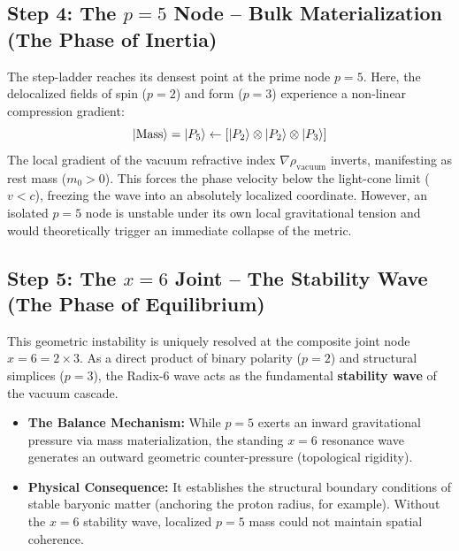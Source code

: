 \documentclass[11pt,a4paper]{article}
\theoremstyle{plain}
\theoremstyle{definition}
\theoremstyle{remark}
\begin{document}
\subsection{Step 4: The $p=5$ Node – Bulk Materialization (The Phase of Inertia)}
The step-ladder reaches its densest point at the prime node $p=5$. Here, the delocalized fields of spin ($p=2$) and form ($p=3$) experience a non-linear compression gradient:
\begin{equation}
\ket{\text{Mass}} = \ket{P_5} \leftarrow \left[ \ket{P_2} \otimes \ket{P_2} \otimes \ket{P_3} \right]
\end{equation}
The local gradient of the vacuum refractive index $\nabla\rho_{\text{vacuum}}$ inverts, manifesting as rest mass ($m_0 > 0$). This forces the phase velocity below the light-cone limit ($v < c$), freezing the wave into an absolutely localized coordinate. However, an isolated $p=5$ node is unstable under its own local gravitational tension and would theoretically trigger an immediate collapse of the metric.

\subsection{Step 5: The $x=6$ Joint – The Stability Wave (The Phase of Equilibrium)}
This geometric instability is uniquely resolved at the composite joint node $x = 6 = 2 \times 3$. As a direct product of binary polarity ($p=2$) and structural simplices ($p=3$), the Radix-6 wave acts as the fundamental \textbf{stability wave} of the vacuum cascade.
\begin{itemize}
    \item \textbf{The Balance Mechanism:} While $p=5$ exerts an inward gravitational pressure via mass materialization, the standing $x=6$ resonance wave generates an outward geometric counter-pressure (topological rigidity).
    \item \textbf{Physical Consequence:} It establishes the structural boundary conditions of stable baryonic matter (anchoring the proton radius, for example). Without the $x=6$ stability wave, localized $p=5$ mass could not maintain spatial coherence.
\end{itemize}
\end{document}
